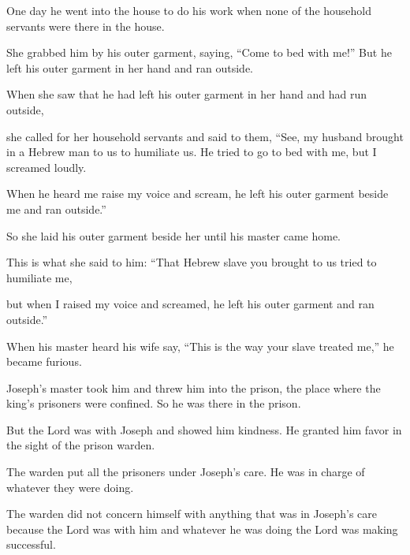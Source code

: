 \begin{scripture}
 One day he went into the house to do his work when none of the household servants were there in the house.
 She grabbed him by his outer garment, saying, ``Come to bed with me!'' But he left his outer garment in her hand and ran outside.
 When she saw that he had left his outer garment in her hand and had run outside,
 she called for her household servants and said to them, ``See, my husband brought in a Hebrew man to us to humiliate us. He tried to go to bed with me, but I screamed loudly.
 When he heard me raise my voice and scream, he left his outer garment beside me and ran outside.''
\everypar{}

 So she laid his outer garment beside her until his master came home.
 This is what she said to him: ``That Hebrew slave you brought to us tried to humiliate me,
 but when I raised my voice and screamed, he left his outer garment and ran outside.''
\everypar{}

 When his master heard his wife say, ``This is the way your slave treated me,'' he became furious.
 Joseph's master took him and threw him into the prison, the place where the king's prisoners were confined. So he was there in the prison.
\everypar{}

 But the Lord was with Joseph and showed him kindness. He granted him favor in the sight of the prison warden.
 The warden put all the prisoners under Joseph's care. He was in charge of whatever they were doing.
 The warden did not concern himself with anything that was in Joseph's care because the Lord was with him and whatever he was doing the Lord was making successful.


\end{scripture}
